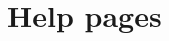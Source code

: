 \documentclass[fleqn]{book}
\begin{document}
\tableofcontents



\appendix
\chapter{Help pages}

\end{document}
